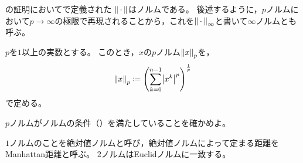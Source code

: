 \documentclass[b5paper,draft]{ltjsbook}
\begin{document}
\begin{eg}[一様ノルム]
    の証明においてで定義された
    $\norm{\dummy}$はノルムである。
    後述するように，$p$ノルムにおいて$p\to\infty$の極限で再現されることから，これを$\norm{\dummy}_\infty$と書いて$\infty$ノルムとも呼ぶ。
\end{eg}

\begin{defi}[$p$ノルム]
    $p$を$1$以上の実数とする。
    このとき，$x$の$p$ノルム$\norm{x}_p$を，
    \begin{equation}
        \norm{x}_p \coloneqq \pare{\sum_{k=0}^{n-1} \abs{x^k}^p}^{\frac{1}{p}}
    \end{equation}
    で定める。
\end{defi}

\begin{prob}
    $p$ノルムがノルムの条件（）を満たしていることを確かめよ。
\end{prob}

$1$ノルムのことを絶対値ノルムと呼び，絶対値ノルムによって定まる距離をManhattan距離と呼ぶ。
$2$ノルムはEuclidノルムに一致する。
\end{document}
